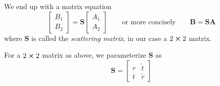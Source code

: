\documentclass[11pt, a4paper]{article}
\newcommand{\eqtext}[1]{\qquad \text{#1} \qquad}
\renewcommand{\vec}[1]{\bm{#1}} %
\newcommand{\mat}[1]{\mathbf{#1}} %
\begin{document}
\begin{itemize}
	We end up with a matrix equation
	\begin{equation*}
		\begin{bmatrix}
			B_{1}\\
			B_{2}
		\end{bmatrix}
		= 
		\mat{S}
		\begin{bmatrix}
			A_{1}\\
			A_{2}
		\end{bmatrix}
		\eqtext{or more concisely} \vec{B} = \mat{S} \vec{A}
	\end{equation*}
	where $ \mat{S} $ is called the \textit{scattering matrix}, in our case a $ 2 \cross 2 $ matrix. 
	
	For a $ 2 \cross 2 $ matrix as above, we parameterize $ \mat{S} $ as
	\begin{equation*}
		\mat{S} = 
		\begin{bmatrix}
			r & \tilde{t}\\
			t & \tilde{r}
		\end{bmatrix}
	\end{equation*} 
\end{itemize}
\end{document}
